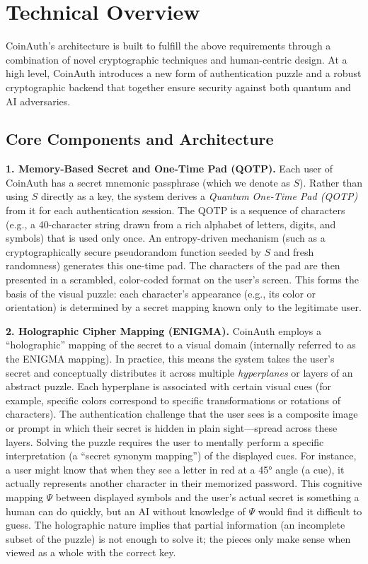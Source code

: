 \documentclass[10pt,letterpaper]{article}
\begin{document}
\section{Technical Overview}
CoinAuth’s architecture is built to fulfill the above requirements through a combination of novel cryptographic techniques and human-centric design. At a high level, CoinAuth introduces a new form of authentication puzzle and a robust cryptographic backend that together ensure security against both quantum and AI adversaries.

\subsection{Core Components and Architecture}


\noindent \textbf{1. Memory-Based Secret and One-Time Pad (QOTP).} Each user of CoinAuth has a secret mnemonic passphrase (which we denote as \( S \)). Rather than using \( S \) directly as a key, the system derives a \emph{Quantum One-Time Pad (QOTP)} from it for each authentication session. The QOTP is a sequence of characters (e.g., a 40-character string drawn from a rich alphabet of letters, digits, and symbols) that is used only once. An entropy-driven mechanism (such as a cryptographically secure pseudorandom function seeded by \( S \) and fresh randomness) generates this one-time pad. The characters of the pad are then presented in a scrambled, color-coded format on the user’s screen. This forms the basis of the visual puzzle: each character’s appearance (e.g., its color or orientation) is determined by a secret mapping known only to the legitimate user.

\noindent \textbf{2. Holographic Cipher Mapping (ENIGMA).} CoinAuth employs a “holographic” mapping of the secret to a visual domain (internally referred to as the \textsc{ENIGMA} mapping). In practice, this means the system takes the user’s secret and conceptually distributes it across multiple \emph{hyperplanes} or layers of an abstract puzzle. Each hyperplane is associated with certain visual cues (for example, specific colors correspond to specific transformations or rotations of characters). The authentication challenge that the user sees is a composite image or prompt in which their secret is hidden in plain sight---spread across these layers. Solving the puzzle requires the user to mentally perform a specific interpretation (a “secret synonym mapping”) of the displayed cues. For instance, a user might know that when they see a letter in red at a 45° angle (a cue), it actually represents another character in their memorized password. This cognitive mapping \( \Psi \) between displayed symbols and the user’s actual secret is something a human can do quickly, but an AI without knowledge of \( \Psi \) would find it difficult to guess. The holographic nature implies that partial information (an incomplete subset of the puzzle) is not enough to solve it; the pieces only make sense when viewed as a whole with the correct key.
\end{document}

